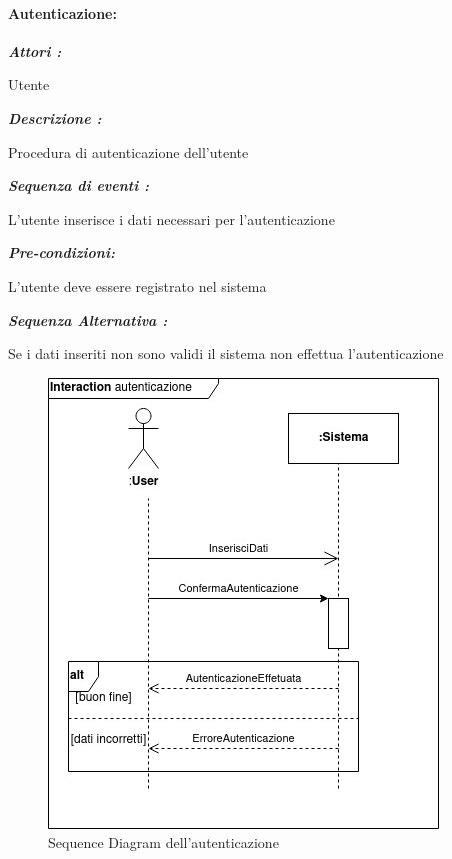 \documentclass{article}
\begin{document}
\paragraph{Autenticazione:}
\begin{mdframed}

	\noindent\textit{\textbf{Attori :}}


	Utente

	\noindent\textit{\textbf{Descrizione :}}


	Procedura di autenticazione dell'utente

	\noindent\textit{\textbf{Sequenza di eventi :}}


	L’utente inserisce i dati necessari per l'autenticazione

	\noindent\textit{\textbf{Pre-condizioni:}}


	L'utente deve essere registrato nel sistema

	\noindent\textit{\textbf{Sequenza Alternativa :}}


	Se i dati inseriti non sono validi il sistema non effettua
	l'autenticazione

\end{mdframed}

\begin{figure}[h!]
	\centering
	\includegraphics[width=\textwidth]{SDautenticazione.jpg}
	\caption{Sequence Diagram dell'autenticazione}
	\label{fig:SDautenticazione}
\end{figure}
\end{document}
